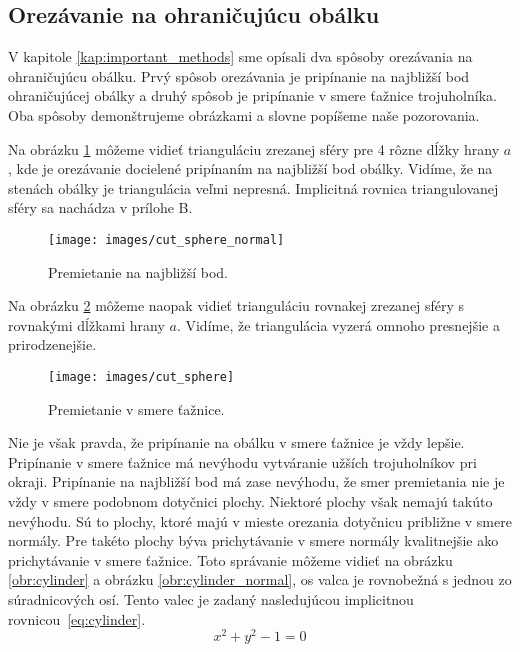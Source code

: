 \subsection{Orezávanie na ohraničujúcu obálku}

V kapitole \ref{kap:important_methods} sme opísali dva spôsoby orezávania na ohraničujúcu obálku.
Prvý spôsob orezávania je pripínanie na najbližší bod ohraničujúcej obálky a druhý spôsob je
pripínanie v smere ťažnice trojuholníka. 
Oba spôsoby demonštrujeme obrázkami
a slovne popíšeme naše pozorovania.

Na obrázku \ref{obr:cut_sphere_normal} môžeme vidieť trianguláciu zrezanej sféry pre 4 rôzne dĺžky 
hrany $a$, kde je orezávanie docielené pripínaním na najbližší bod obálky. Vidíme, že na stenách obálky 
je triangulácia veľmi nepresná. Implicitná rovnica triangulovanej sféry sa nachádza v prílohe B.

\begin{figure}
    \centerline{\texttt{[image: images/cut\_sphere\_normal]}}
    \caption[Ohraničená triangulácia gule -- premietanie na najbližší bod]
    {Premietanie na najbližší bod.}
    \label{obr:cut_sphere_normal}
\end{figure}

Na obrázku \ref{obr:cut_sphere} môžeme naopak vidieť trianguláciu rovnakej zrezanej sféry s rovnakými 
dĺžkami hrany $a$.
Vidíme, že triangulácia vyzerá omnoho presnejšie a prirodzenejšie.

\begin{figure}
    \centerline{\texttt{[image: images/cut\_sphere]}}
    \caption[Ohraničená triangulácia gule -- premietanie v smere ťažnice]
    {Premietanie v smere ťažnice.}
    \label{obr:cut_sphere}
\end{figure}

Nie je však pravda, že pripínanie na obálku v smere ťažnice je vždy lepšie.
Pripínanie v smere ťažnice má nevýhodu vytváranie užších trojuholníkov pri 
okraji. Pripínanie na najbližší bod má zase nevýhodu, že smer premietania
nie je vždy v smere podobnom dotyčnici plochy.
Niektoré plochy však nemajú takúto nevýhodu.
Sú to plochy, ktoré majú v mieste orezania dotyčnicu približne v smere normály.
Pre takéto plochy býva prichytávanie v smere normály kvalitnejšie ako 
prichytávanie v smere ťažnice.
Toto správanie môžeme vidieť na obrázku \ref{obr:cylinder} a obrázku \ref{obr:cylinder_normal}, 
os valca je rovnobežná s jednou zo súradnicových osí. 
Tento valec je zadaný nasledujúcou implicitnou rovnicou~\ref{eq:cylinder}.
\begin{equation}
\label{eq:cylinder}
    x^2+y^2-1 = 0
\end{equation}

